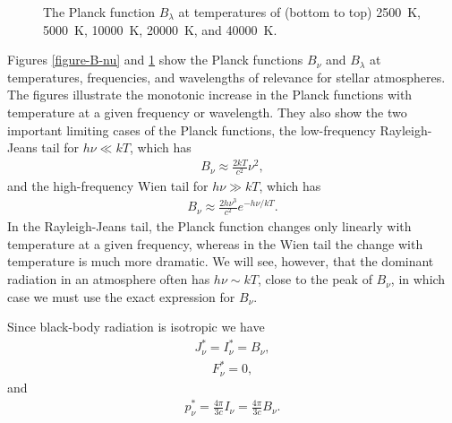 \begin{figure}
\footnotesize
{}
\caption{The Planck function $B_\lambda$ at temperatures of (bottom to
  top) 2500~K, 5000~K, 10000~K, 20000~K, and 40000~K.}
\label{figure-B-lambda}
\end{figure}
Figures \ref{figure-B-nu} and \ref{figure-B-lambda} show the Planck
functions $B_\nu$ and $B_\lambda$ at temperatures, frequencies, and
wavelengths of relevance for stellar atmospheres. The figures illustrate
the monotonic increase in the Planck functions with temperature at a
given frequency or wavelength. They also show the two important limiting
cases of the Planck functions, the low-frequency Rayleigh-Jeans tail for
$h\nu \ll kT$, which has
\begin{align}
B_\nu \approx \frac{2kT}{c^2} \nu^2,
\end{align}
and the high-frequency Wien tail for $h\nu \gg kT$, which has 
\begin{align}
B_\nu \approx \frac{2 h \nu^3}{c^2} e^{-h\nu/kT}.
\end{align}
In the Rayleigh-Jeans tail, the Planck function changes only linearly
with temperature at a given frequency, whereas in the Wien tail the
change with temperature is much more dramatic. We will see, however,
that the dominant radiation in an atmosphere often has $h\nu \sim kT$,
close to the peak of $B_\nu$, in which case we must use the exact
expression for $B_\nu$.

\newslide

Since black-body radiation is isotropic we have
\begin{align}
J_\nu^* = I_\nu^* = B_\nu,
\end{align}
\begin{align}
F_\nu^* = 0,
\end{align}
and
\begin{align}
p_\nu^* = \frac{4\pi}{3c} I_\nu = \frac{4\pi}{3c} B_\nu.
\end{align}

